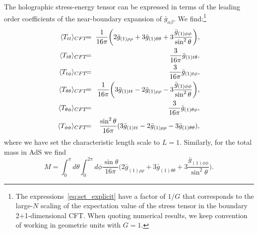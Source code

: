 \documentclass[aps,letterpaper,twocolumn,nofootinbib]{revtex4}
\numberwithin{equation}{section}
\begin{document}
The holographic stress-energy tensor can be expressed in terms of the leading order coefficients of the near-boundary expansion of $\bar{g}_{\alpha\beta}$. We find:\footnote{The expressions~\eqref{eq:set_explicit} have a factor of $1/G$ that corresponds to the large-$N$ scaling of the expectation value of the stress tensor in the boundary 2+1-dimensional CFT. When quoting numerical results, we keep convention of working in geometric units with $G=1$.}
\begin{eqnarray}
\label{eq:set_explicit}
\langle T_{tt}\rangle_{CFT}&\hspace{-0.15cm}=&\hspace{-0.15cm}\frac{1}{16\pi} \biggl(2\bar{g}_{(1)\rho\rho}+3\bar{g}_{(1)\theta\theta}+3\frac{\bar{g}_{(1)\phi\phi}}{\sin^2\theta}\biggr), \nonumber \\
\langle T_{t\theta}\rangle_{CFT}&\hspace{-0.15cm}=&\hspace{-0.15cm}\frac{3}{16\pi}\bar{g}_{(1)t\theta}, \nonumber \\
\langle T_{t\phi}\rangle_{CFT}&\hspace{-0.15cm}=&\hspace{-0.15cm}\frac{3}{16\pi}\bar{g}_{(1)t\phi}, \nonumber \\
\langle T_{\theta\theta}\rangle_{CFT}&\hspace{-0.15cm}=&\hspace{-0.15cm}\frac{1}{16\pi} \biggl(3\bar{g}_{(1)tt}-2\bar{g}_{(1)\rho\rho}-3\frac{\bar{g}_{(1)\phi\phi}}{\sin^2\theta}\biggr), \nonumber \\
\langle T_{\theta\phi}\rangle_{CFT}&\hspace{-0.15cm}=&\hspace{-0.15cm}\frac{3}{16\pi}\bar{g}_{(1)\theta\phi}, \nonumber \\
\langle T_{\phi\phi}\rangle_{CFT}&\hspace{-0.15cm}=&\hspace{-0.15cm}\frac{\sin^2\theta}{16\pi} (3\bar{g}_{(1)tt}-2\bar{g}_{(1)\rho\rho}-3\bar{g}_{(1)\theta\theta}),
\end{eqnarray}
where we have set the characteristic length scale to $L=1$. 
Similarly, for the total mass in AdS we find
\begin{equation}
\label{eq:AdSmasscalc}
M=\int_0^\pi d\theta \int_0^{2\pi}d\phi\frac{\sin\theta}{16\pi} \biggl(2\bar{g}_{(1)\rho\rho}+3\bar{g}_{(1)\theta\theta}+3\frac{\bar{g}_{(1)\phi\phi}}{\sin^2\theta}\biggr).
\end{equation}
\end{document}
